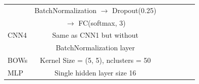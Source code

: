 \documentclass{article}
\begin{document}
\begin{table}[h!]
\begin{center}
\begin{small}
\begin{sc}
\begin{tabular}{lcccccr}
 & BatchNormalization $\rightarrow$ Dropout(0.25)\\
\belowspace
 & $\rightarrow$ FC(softmax, 3)\\
\hline
\abovespace
CNN4 & Same as CNN1 but without \\
\belowspace
 & BatchNormalization layer\\
\hline
\abovespace\belowspace
BOWs & Kernel Size = (5, 5), nclusters = 50\\
\hline
\abovespace\belowspace
MLP & Single hidden layer size 16\\
 \hline
 \end{tabular}
 \end{sc}
 \end{small}
 \end{center}
 \vskip -0.1in
\end{table}
\end{document}
